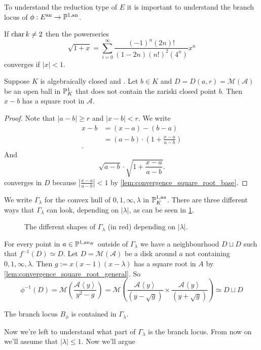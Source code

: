 To understand the reduction type of $E$ it is important to understand the branch locus of $\phi: E{}^{\text{an}} \to \mathbb{P}^{1, \text{an}}$. 

\begin{lemma}\label{lem:convergence_square_root_base}
	If $\operatorname{char} k \ne 2$ then the powerseries \[
		\sqrt{1 + x}  = \sum_{i = 0}^{\infty} \frac{(-1)^{n}(2n)!}{(1-2n)(n!)^2(4^{n})} x^{n}
	\]
	converges if $|x| < 1$. 
\end{lemma}
\begin{lemma}\label{lem:convergence_square_root_general}
	Suppose $K$ is algebraically closed and . 
	Let $b \in K$ and $D = D(a, r) = \mathcal{M} (\mathcal{A} )$ be an open ball in $\mathbb{P}^{1}_K$ that does not contain the zariski closed point $b$.  
	Then $x-b$ has a square root in $\mathcal{A} $.
\end{lemma}
\begin{proof}
	Note that $|a - b| \ge r$ and $|x-b| < r$. 
	We write 
	\begin{align*}
		x - b &= (x - a) - (b-a)\\
		      &= (a - b) \cdot \left( 1 + \frac{x - a}{a - b} \right)  \\
	.\end{align*}
	And \[
		\sqrt{a-b} \cdot  \sqrt{1 + \frac{x - a}{a - b}} 
	.\]
	converges in $D$ because $|\frac{x - a}{a - b}| < 1$ by \cref{lem:convergence_square_root_base}. 
\end{proof}
We write $\Gamma_\lambda$ for the convex hull of $0, 1, \infty, \lambda$ in $\mathbb{P}^{1, \text{an}}_K$. 
There are three different ways that $\Gamma_\lambda$ can look, depending on $|\lambda|$, as can be seen in \cref{fig:gamma_lambda_types}.
\begin{figure}[ht]
    \centering
    \caption{The different shapes of $\Gamma_\lambda$ (in red) depending on $|\lambda|$.}
    \label{fig:gamma_lambda_types}
\end{figure}

\begin{corollary}
	For every point in $a \in \mathbb{P}^{1, \text{an}_K}$ outside of $\Gamma_\lambda$ we have a neighbourhood $D \sqcup D$ such that $f^{-1}(D) \simeq D$. 
	Let $D = \mathcal{M} (\mathcal{A} )$ be a disk around $a$ not containing $0, 1, \infty, \lambda$. 
	Then $g:= x(x-1)(x-\lambda)$ has a square root in $A$ by \cref{lem:convergence_square_root_general}. 
	So \[
	\phi^{-1}(D) = \mathcal{M} \left( \frac{\mathcal{A} \left<y \right>}{y^2 - g} \right) = \mathcal{M} \left( \frac{\mathcal{A} \left<y \right>}{(y - \sqrt{g} )} \times \frac{\mathcal{A} \left<y \right>}{(y + \sqrt{g} )} \right) \simeq D \sqcup D\] 
\end{corollary}
\begin{corollary}
	The branch locus $B_\phi$ is contained in $\Gamma_\lambda$. 
\end{corollary}
Now we're left to understand what part of $\Gamma_\lambda$ is the branch locus. 
From now on we'll assume that $|\lambda| \le 1$.
Now we'll argue 


